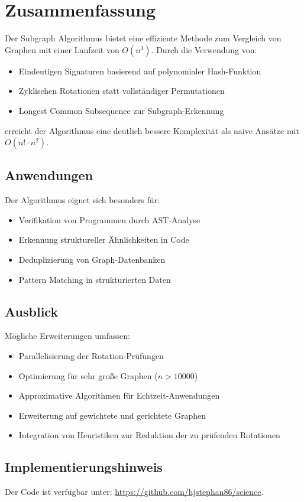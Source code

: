 ﻿\documentclass[a4paper,12pt]{article}
\theoremstyle{definition}
\begin{document}
\section{Zusammenfassung}

Der Subgraph Algorithmus bietet eine effiziente Methode zum Vergleich von Graphen mit einer Laufzeit von $O(n^3)$. Durch die Verwendung von:

\begin{itemize}
	\item Eindeutigen Signaturen basierend auf polynomialer Hash-Funktion
	\item Zyklischen Rotationen statt vollständiger Permutationen
	\item Longest Common Subsequence zur Subgraph-Erkennung
\end{itemize}

erreicht der Algorithmus eine deutlich bessere Komplexität als naive Ansätze mit $O(n! \cdot n^2)$.

\subsection{Anwendungen}

Der Algorithmus eignet sich besonders für:
\begin{itemize}
	\item Verifikation von Programmen durch AST-Analyse
	\item Erkennung struktureller Ähnlichkeiten in Code
	\item Deduplizierung von Graph-Datenbanken
	\item Pattern Matching in strukturierten Daten
\end{itemize}

\subsection{Ausblick}

Mögliche Erweiterungen umfassen:
\begin{itemize}
	\item Parallelisierung der Rotation-Prüfungen
	\item Optimierung für sehr große Graphen ($n > 10000$)
	\item Approximative Algorithmen für Echtzeit-Anwendungen
	\item Erweiterung auf gewichtete und gerichtete Graphen
	\item Integration von Heuristiken zur Reduktion der zu prüfenden Rotationen
\end{itemize}

\subsection{Implementierungshinweis}

Der Code ist verfügbar unter: \url{https://github.com/hjstephan86/science}.
\end{document}
